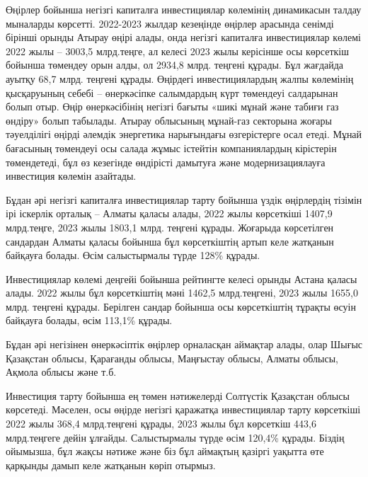 \begin{multicols}{2}
Өңірлер бойынша негізгі капиталға инвестициялар көлемінің динамикасын
талдау мыналарды көрсетті. 2022-2023 жылдар кезеңінде өңірлер арасында
сенімді бірінші орынды Атырау өңірі алады, онда негізгі капиталға
инвестициялар көлемі 2022 жылы -- 3003,5 млрд.теңге, ал келесі 2023 жылы
керісінше осы көрсеткіш бойынша төмендеу орын алды, ол 2934,8 млрд.
теңгені құрады. Бұл жағдайда ауытқу 68,7 млрд. теңгені құрады. Өңірдегі
инвестициялардың жалпы көлемінің қысқаруының себебі -- өнеркәсіпке
салымдардың күрт төмендеуі салдарынан болып отыр. Өңір өнеркәсібінің
негізгі бағыты «шикі мұнай және табиғи газ өндіру» болып табылады.
Атырау облысының мұнай-газ секторына жоғары тәуелділігі өңірді әлемдік
энергетика нарығындағы өзгерістерге осал етеді. Мұнай бағасының
төмендеуі осы салада жұмыс істейтін компаниялардың кірістерін
төмендетеді, бұл өз кезегінде өндірісті дамытуға және модернизациялауға
инвестиция көлемін азайтады.

Бұдан әрі негізгі капиталға инвестициялар тарту бойынша үздік өңірлердің
тізімін ірі іскерлік орталық -- Алматы қаласы алады, 2022 жылы
көрсеткіші 1407,9 млрд.теңге, 2023 жылы 1803,1 млрд. теңгені құрады.
Жоғарыда көрсетілген сандардан Алматы қаласы бойынша бұл көрсеткіштің
артып келе жатқанын байқауға болады. Өсім салыстырмалы түрде 128\%
құрады.

Инвестициялар көлемі деңгейі бойынша рейтингте келесі орынды Астана
қаласы алады. 2022 жылы бұл көрсеткіштің мәні 1462,5 млрд.теңгені, 2023
жылы 1655,0 млрд. теңгені құрады. Берілген сандар бойынша осы
көрсеткіштің тұрақты өсуін байқауға болады, өсім 113,1\% құрады.

Бұдан әрі негізінен өнеркәсіптік өңірлер орналасқан аймақтар алады, олар
Шығыс Қазақстан облысы, Қарағанды облысы, Маңғыстау облысы, Алматы
облысы, Ақмола облысы және т.б.

Инвестиция тарту бойынша ең төмен нәтижелерді Солтүстік Қазақстан облысы
көрсетеді. Мәселен, осы өңірде негізгі қаражатқа инвестициялар тарту
көрсеткіші 2022 жылы 368,4 млрд.теңгені құрады, 2023 жылы бұл көрсеткіш
443,6 млрд.теңгеге дейін ұлғайды. Салыстырмалы түрде өсім 120,4\%
құрады. Біздің ойымызша, бұл жақсы нәтиже және біз бұл аймақтың қазіргі
уақытта өте қарқынды дамып келе жатқанын көріп отырмыз.
\end{multicols}

